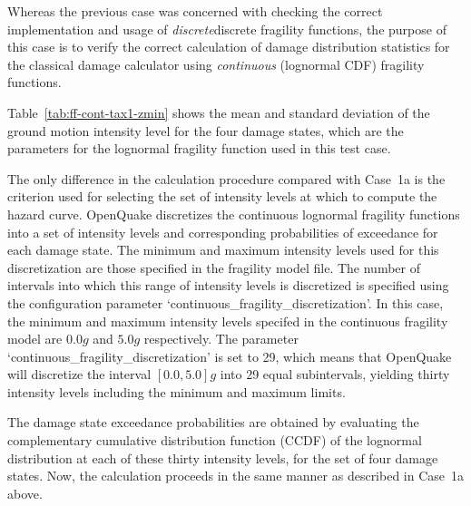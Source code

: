 Whereas the previous case was concerned with checking the correct implementation and usage of \emph{discrete}discrete fragility functions, the purpose of this case is to verify the correct calculation of damage distribution statistics for the classical damage calculator using \emph{continuous} (lognormal CDF) fragility functions.

Table~\ref{tab:ff-cont-tax1-zmin} shows the mean and standard deviation of the ground motion intensity level for the four damage states, which are the parameters for the lognormal fragility function used in this test case.

The only difference in the calculation procedure compared with Case~1a is the criterion used for selecting the set of intensity levels at which to compute the hazard curve. OpenQuake discretizes the continuous lognormal fragility functions into a set of intensity levels and corresponding probabilities of exceedance for each damage state. The minimum and maximum intensity levels used for this discretization are those specified in the fragility model file. The number of intervals into which this range of intensity levels is discretized is specified using the configuration parameter `continuous\_fragility\_discretization'. In this case, the minimum and maximum intensity levels specifed in the continuous fragility model are $0.0 g$ and $5.0 g$ respectively. The parameter `continuous\_fragility\_discretization' is set to 29, which means that OpenQuake will discretize the interval $[0.0, 5.0]g$ into 29 equal subintervals, yielding thirty intensity levels including the minimum and maximum limits.

The damage state exceedance probabilities are obtained by evaluating the complementary cumulative distribution function (CCDF) of the lognormal distribution at each of these thirty intensity levels, for the set of four damage states. Now, the calculation proceeds in the same manner as described in Case~1a above.